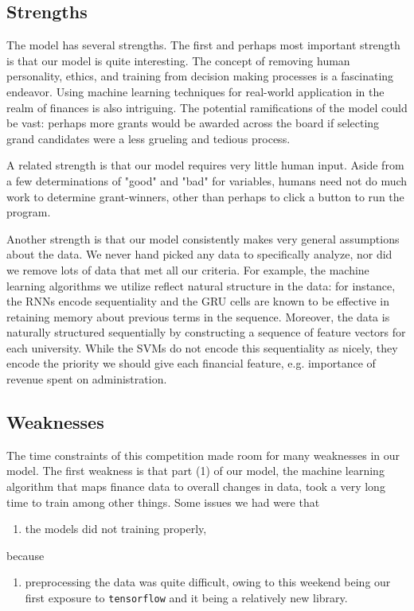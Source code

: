 \documentclass[paper.tex]{subfiles}
\begin{document}
	\subsection{Strengths}
	The model has several strengths. The first and perhaps most important strength is that our model is quite interesting. The concept of removing human personality, ethics, and training from decision making processes is a fascinating endeavor. Using machine learning techniques for real-world application in the realm of finances is also intriguing. The potential ramifications of the model could be vast: perhaps more grants would be awarded across the board if selecting grand candidates were a less grueling and tedious process. 
	
	A related strength is that our model requires very little human input. Aside from a few determinations of "good" and "bad" for variables, humans need not do much work to determine grant-winners, other than perhaps to click a button to run the program.
	
	Another strength is that our model consistently makes very general assumptions about the data. We never hand picked any data to specifically analyze, nor did we remove lots of data that met all our criteria. For example, the machine learning algorithms we utilize reflect natural structure in the data: for instance, the RNNs encode sequentiality and the GRU cells are known to be effective in retaining memory about previous terms in the sequence. Moreover, the data is naturally structured sequentially by constructing a sequence of feature vectors for each university. While the SVMs do not encode this sequentiality as nicely, they encode the priority we should give each financial feature, e.g. importance of revenue spent on administration.
		
	\subsection{Weaknesses}
	The time constraints of this competition made room for many weaknesses in our model. The first weakness is that part (1) of our model, the machine learning algorithm that maps finance data to overall changes in data, took a very long time to train among other things. Some issues we had were that
\begin{enumerate}
\item the models did not training properly, 
\end{enumerate}
because
\begin{enumerate}[resume]
\item preprocessing the data was quite difficult, owing to this weekend being our first exposure to \texttt{tensorflow} and it being a relatively new library.
\end{enumerate}	
\end{document}
